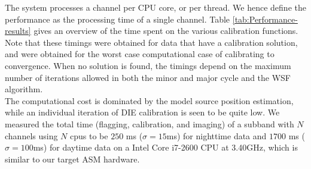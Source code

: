 \documentclass{aa}
\begin{document}
The system processes a channel per CPU core, or per thread. We hence define the
performance   as   the   processing   time   of   a   single   channel.    Table
\ref{tab:Performance-results} gives an overview of the time spent on the various
calibration functions. Note that these  timings were obtained for data that have
a calibration solution, and were  obtained for the worst case computational case
of calibrating to convergence. When no  solution is found, the timings depend on
the maximum number  of iterations allowed in both the minor  and major cycle and
the WSF  algorithm. \\ The computational  cost is dominated by  the model source
position estimation, while an individual iteration of DIE calibration is seen to
be quite low.  We measured the  total time (flagging, calibration, and imaging) of a
subband with $N$  channels using $N$ cpus  to be $250$ ms ($\sigma  = 15$ms) for
nighttime data and  $1700$ ms ($\sigma = 100$ms) for daytime  data on a Intel
Core i7-2600 CPU at 3.40GHz, which is similar to our target ASM hardware.
\begin{table}[tbh]
\caption{Functional profile of real-time calibration and imaging code.}
\label{tab:Performance-results}

\end{table}
\end{document}
